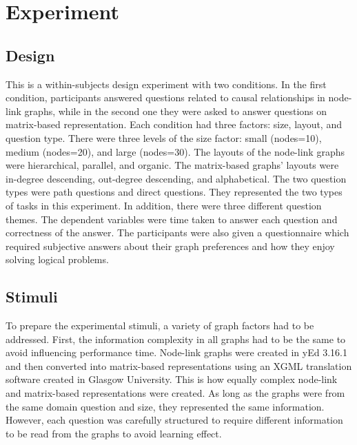 \documentclass{l4proj}
\begin{document}
\chapter{Experiment}
\label{chap:exp}

\section{Design}

This is a within-subjects design experiment with two conditions. In the first condition, participants answered questions related to causal relationships in node-link graphs, while in the second one they were asked to answer questions on matrix-based representation. Each condition had three factors: size, layout, and question type. There were three levels of the size factor: small (nodes=10), medium (nodes=20), and large (nodes=30). The layouts of the node-link graphs were hierarchical, parallel, and organic. The matrix-based graphs' layouts were in-degree descending, out-degree descending, and alphabetical. The two question types were path questions and direct questions. They represented the two types of tasks in this experiment. In addition, there were three different question themes. The dependent variables were time taken to answer each question and correctness of the answer. The participants were also given a questionnaire which required subjective answers about their graph preferences and how they enjoy solving logical problems. 

\section{Stimuli}

To prepare the experimental stimuli, a variety of graph factors had to be addressed. First, the information complexity in all graphs had to be the same to avoid influencing performance time. Node-link graphs were created in yEd 3.16.1 and then converted into matrix-based representations using an XGML translation software created in Glasgow University. This is how equally complex node-link and matrix-based representations were created. As long as the graphs were from the same domain question and size, they represented the same information. However, each question was carefully structured to require different information to be read from the graphs to avoid learning effect. 
\end{document}

